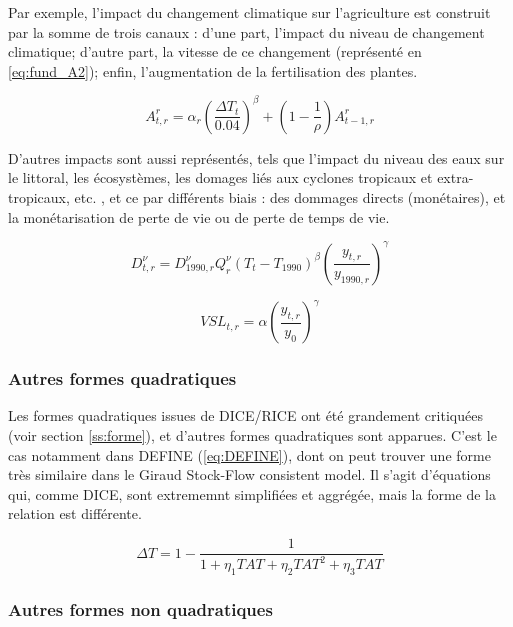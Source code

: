 Par exemple, l'impact du changement climatique sur l'agriculture est construit par la somme de trois canaux : d'une part, l'impact du niveau de changement climatique; d'autre part, la vitesse de ce changement (représenté en \ref{eq:fund_A2}); enfin, l'augmentation de la fertilisation des plantes. 

\begin{equation}
    A_{t,r}^{r}=\alpha_{r}\left(\frac{\Delta T_{t}}{0.04}\right)^{\beta}+\left(1-\frac{1}{\rho}\right)A_{t-1,r}^{r}
    \label{eq:fund_A2}
\end{equation}

D'autres impacts sont aussi représentés, tels que l'impact du niveau des eaux sur le littoral, les écosystèmes, les domages liés aux cyclones tropicaux et extra-tropicaux, etc. , et ce par différents biais : des dommages directs (monétaires), et la monétarisation de perte de vie ou de perte de temps de vie. 

\begin{equation}
    D_{t,r}^{\nu}=D_{1990,r}^{\nu}Q_{r}^{\nu}\left(T_{t}-T_{1990}\right)^{\beta}\left(\frac{y_{t,r}}{y_{1990,r}}\right)^{\gamma}
    \label{eq:fund_HV}
\end{equation}

\begin{equation}
    V S L_{t,r}=\alpha\left(\frac{y_{t,r}}{y_{0}}\right)^{\gamma}
    \label{eq:VSL}
\end{equation}

\subsubsection{Autres formes quadratiques}

Les formes quadratiques issues de DICE/RICE ont été grandement critiquées (voir section \ref{ss:forme}), et d'autres formes quadratiques sont apparues. C'est le cas notamment dans DEFINE (\ref{eq:DEFINE}), dont on peut trouver une forme très similaire dans le Giraud Stock-Flow consistent model. Il s'agit d'équations qui, comme DICE, sont extrememnt simplifiées et aggrégée, mais la forme de la relation est différente. 

\begin{equation}
    \Delta T = 1 - \frac{1}{1 + \eta_1 TAT + \eta_2 TAT^2 + \eta_3 TAT}
    \label{eq:DEFINE}
\end{equation}

\subsubsection{Autres formes non quadratiques}



